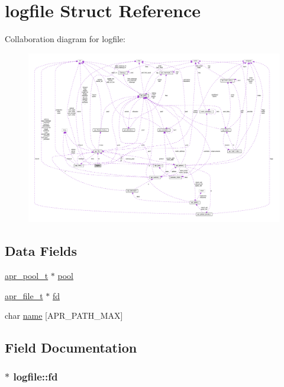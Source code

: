 \hypertarget{structlogfile}{}\section{logfile Struct Reference}
\label{structlogfile}


Collaboration diagram for logfile\+:
\nopagebreak
\begin{figure}[H]
\begin{center}
\leavevmode
\includegraphics[width=350pt]{structlogfile__coll__graph}
\end{center}
\end{figure}
\subsection*{Data Fields}
\begin{DoxyCompactItemize}
\item 
\hyperlink{structapr__pool__t}{apr\+\_\+pool\+\_\+t} $\ast$ \hyperlink{structlogfile_a83746da6192e7d87efd70b5b87cca36f}{pool}
\item 
\hyperlink{structapr__file__t}{apr\+\_\+file\+\_\+t} $\ast$ \hyperlink{structlogfile_a1ceccfc02da7f53b230ad826d5fa8a31}{fd}
\item 
char \hyperlink{structlogfile_a3c8ce40a582d90edce76629eb057fd0e}{name} \mbox{[}A\+P\+R\+\_\+\+P\+A\+T\+H\+\_\+\+M\+AX\mbox{]}
\end{DoxyCompactItemize}


\subsection{Field Documentation}
\subsubsection[{\texorpdfstring{fd}{fd}}]{$\ast$ logfile\+::fd}\hypertarget{structlogfile_a1ceccfc02da7f53b230ad826d5fa8a31}{}\label{structlogfile_a1ceccfc02da7f53b230ad826d5fa8a31}
